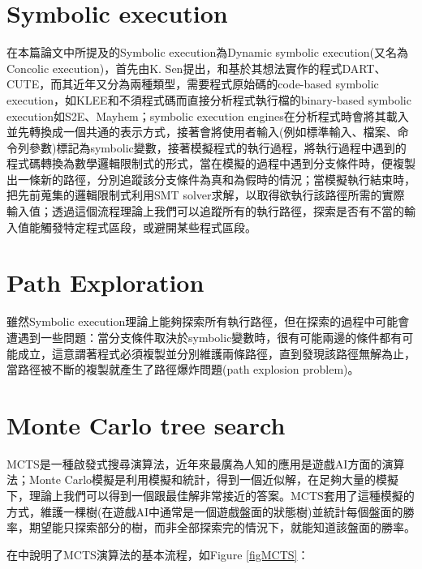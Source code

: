 \documentclass[12pt,a4paper,oneside]{book}
\begin{document}
\section{Symbolic execution}

在本篇論文中所提及的Symbolic execution為Dynamic symbolic execution(又名為Concolic execution)，首先由K. Sen\cite{sen2007concolic}提出，和基於其想法實作的程式DART\cite{godefroid2005dart}、CUTE\cite{sen2005cute}，而其近年又分為兩種類型，需要程式原始碼的code-based symbolic execution，如KLEE\cite{cadar2008klee}和不須程式碼而直接分析程式執行檔的binary-based symbolic execution如S2E\cite{chipounov2012s2e}、Mayhem\cite{cha2012mayhem}；symbolic execution engines在分析程式時會將其載入並先轉換成一個共通的表示方式，接著會將使用者輸入(例如標準輸入、檔案、命令列參數)標記為symbolic變數，接著模擬程式的執行過程，將執行過程中遇到的程式碼轉換為數學邏輯限制式的形式，當在模擬的過程中遇到分支條件時，便複製出一條新的路徑，分別追蹤該分支條件為真和為假時的情況；當模擬執行結束時，把先前蒐集的邏輯限制式利用SMT solver\cite{vanegue2012smt}求解，以取得欲執行該路徑所需的實際輸入值；透過這個流程理論上我們可以追蹤所有的執行路徑，探索是否有不當的輸入值能觸發特定程式區段，或避開某些程式區段。

\section{Path Exploration}

雖然Symbolic execution理論上能夠探索所有執行路徑，但在探索的過程中可能會遭遇到一些問題：當分支條件取決於symbolic變數時，很有可能兩邊的條件都有可能成立，這意謂著程式必須複製並分別維護兩條路徑，直到發現該路徑無解為止，當路徑被不斷的複製就產生了路徑爆炸問題(path explosion problem)。

\section{Monte Carlo tree search}

MCTS是一種啟發式搜尋演算法，近年來最廣為人知的應用是遊戲AI方面的演算法；Monte Carlo模擬是利用模擬和統計，得到一個近似解，在足夠大量的模擬下，理論上我們可以得到一個跟最佳解非常接近的答案。MCTS套用了這種模擬的方式，維護一棵樹(在遊戲AI中通常是一個遊戲盤面的狀態樹)並統計每個盤面的勝率，期望能只探索部分的樹，而非全部探索完的情況下，就能知道該盤面的勝率。

在\cite{browne2012surveyMCTS}中說明了MCTS演算法的基本流程，如Figure \ref{figMCTS}：
\end{document}
